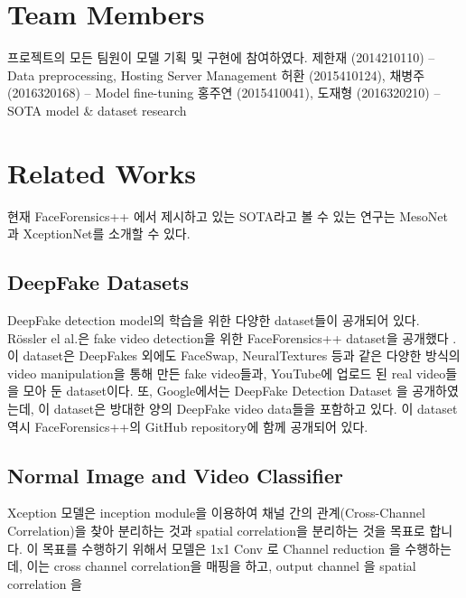 \documentclass{article}
\begin{document}
	\section{Team Members}
	프로젝트의 모든 팀원이 모델 기획 및 구현에 참여하였다. \newline 
	제한재 (2014210110) -- Data preprocessing, Hosting Server Management\newline
	허환 (2015410124), 채병주 (2016320168) -- Model fine-tuning\newline
	홍주연 (2015410041), 도재형 (2016320210) -- SOTA model \& dataset research 
	\section{Related Works}
	
	현재 FaceForensics++ \cite{roessler2019faceforensicspp} 에서 제시하고 있는 SOTA라고 볼 수 있는 연구는 MesoNet\cite{darius2018MesoNet} 과 XceptionNet\cite{chollet2017xception}를 소개할 수 있다. 
	
		\subsection{DeepFake Datasets}
		DeepFake detection model의 학습을 위한 다양한 dataset들이 공개되어 있다. R\"ossler el al.은 fake video detection을 위한 FaceForensics++ dataset을 공개했다 \cite{roessler2019faceforensicspp}. 이 dataset은 DeepFakes 외에도 FaceSwap, NeuralTextures 등과 같은 다양한 방식의 video manipulation을 통해 만든 fake video들과, YouTube에 업로드 된 real video들을 모아 둔 dataset이다. 또, Google에서는 DeepFake Detection Dataset \cite{DDD_GoogleJigSaw2019} 을 공개하였는데, 이 dataset은 방대한 양의 DeepFake video data들을 포함하고 있다. 이 dataset 역시 FaceForensics++의 GitHub 
		repository에 함께 공개되어 있다.
		
		\subsection{Normal Image and Video Classifier}
		Xception 모델은 inception module을 이용하여 채널 간의 관계(Cross-Channel Correlation)을 찾아 분리하는 것과 spatial correlation을 분리하는 것을 목표로 합니다. 이 목표를 수행하기 위해서 모델은 1x1 Conv 로 Channel reduction 을 수행하는데, 이는 cross channel correlation을 매핑을 하고, output channel 을 spatial correlation 을 
		
\end{document}
